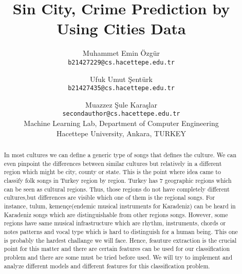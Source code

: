 \documentclass[10pt,twocolumn,letterpaper]{article}
\begin{document}
\title{Sin City, Crime Prediction by Using Cities Data}

\author{Muhammet Emin Özgür\\
{\tt\small b21427229@cs.hacettepe.edu.tr}
\and
Ufuk Umut Şentürk\\
{\tt\small b21427435@cs.hacettepe.edu.tr} \\
\and
Muazzez Şule Karaşlar\\
{\tt\small secondauthor@cs.hacettepe.edu.tr}\\
{Machine Learning Lab, Department of Computer Engineering}\\
{Hacettepe University, Ankara, TURKEY}\\
}

\maketitle
\begin{abstract}
  In most cultures we can define a generic type of songs that defines the culture. We can even pinpoint the differences between similar cultures but relatively in a different region which might be city, county or state. This is the point where idea came to classify folk songs in Turkey region by region. Turkey has 7 geographic regions which can be seen as cultural regions. Thus, those regions do not have completely different cultures,but differences are visible which one of them is the regional songs. For instance, tulum, kemençe(endemic musical instruments for Karadeniz) can be heard in Karadeniz songs which are distinguishable from other regions songs. However, some regions have same musical infrastructure which are rhythm, instruments, chords or notes patterns and vocal type which is hard to distinguish for a human being. This one is probably the hardest challange we will face. Hence, feauture extraction is the crucial point for this matter and there are certain features can be used for our classification problem and there are some must be tried before used. We will try to implement and analyze different models and different features for this classification problem.
\end{abstract}
\end{document}
